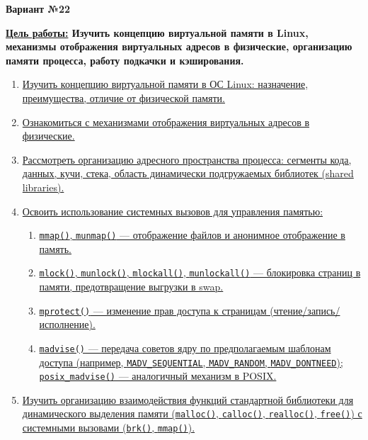 \begin{center}
        {\large \textbf{Вариант №22 \\
        }}
    \end{center}

\textbf{\underline{Цель работы:} Изучить концепцию виртуальной памяти в Linux, механизмы отображения
виртуальных адресов в физические, организацию памяти процесса, работу подкачки и
кэширования.} 

\begin{enumerate}
    \item \hyperref[sec:1]{Изучить концепцию виртуальной памяти в ОС Linux: назначение, преимущества, отличие от физической памяти.}
    
    \item \hyperref[sec:2]{Ознакомиться с механизмами отображения виртуальных адресов в физические.}
    
    \item \hyperref[sec:3]{Рассмотреть организацию адресного пространства процесса: сегменты кода, данных, кучи, стека, область динамически подгружаемых библиотек (shared libraries).}
    
    \item \hyperref[sec:4]{Освоить использование системных вызовов для управления памятью:}
    \begin{enumerate}[label=\arabic{enumi}.\arabic*]
        \item \hyperref[sec:4.1]{\texttt{mmap()}, \texttt{munmap()} — отображение файлов и анонимное отображение в память.}
        \item \hyperref[sec:4.2]{\texttt{mlock()}, \texttt{munlock()}, \texttt{mlockall()}, \texttt{munlockall()} — блокировка страниц в памяти, предотвращение выгрузки в swap.}
        \item \hyperref[sec:4.3]{\texttt{mprotect()} — изменение прав доступа к страницам (чтение/запись/исполнение).}
        \item \hyperref[sec:4.4]{\texttt{madvise()} — передача советов ядру по предполагаемым шаблонам доступа (например, \texttt{MADV\_SEQUENTIAL}, \texttt{MADV\_RANDOM}, \texttt{MADV\_DONTNEED}); \texttt{posix\_madvise()} — аналогичный механизм в POSIX.}
    \end{enumerate}
    
    \item \hyperref[sec:5]{Изучить организацию взаимодействия функций стандартной библиотеки для динамического выделения памяти (\texttt{malloc()}, \texttt{calloc()}, \texttt{realloc()}, \texttt{free()}) с системными вызовами (\texttt{brk()}, \texttt{mmap()}).}
    

\end{enumerate}
